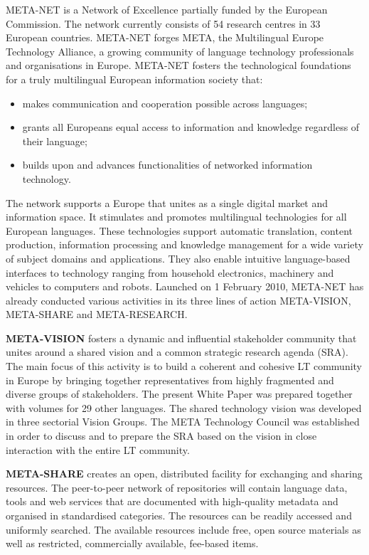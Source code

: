 \begin{multicols}{2}
META-NET is a Network of Excellence partially funded by the European Commission. The network currently consists of 54 research centres in 33 European countries\cite{rehm2011}. META-NET forges META, the Multilingual Europe Technology Alliance, a growing community of language technology professionals and organisations in Europe. META-NET fosters the technological foundations for a truly multilingual European information society that:

\begin{itemize}
\item makes communication and cooperation possible across languages;
\item grants all Europeans equal access to information and knowledge regardless of their language;
\item builds upon and advances functionalities of networked information technology.
\end{itemize}

The network supports a Europe that unites as a single digital market and information space. It stimulates and promotes multilingual technologies for all European languages. These technologies support automatic translation, content production, information processing and knowledge management for a wide variety of subject domains and applications. They also enable intuitive language-based interfaces to technology ranging from household electronics, machinery and vehicles to computers and robots.
Launched on 1 February 2010, META-NET has already conducted various activities in its three lines of action META-VISION, META-SHARE and META-RESEARCH.

\textbf{META-VISION} fosters a dynamic and influential stakeholder community that unites around a shared vision and a common strategic research agenda (SRA). The main focus of this activity is to build a coherent and cohesive LT community in Europe by bringing together representatives from highly fragmented and diverse groups of stakeholders. The present White Paper was prepared together with volumes for 29 other languages. The shared technology vision was developed in three sectorial Vision Groups. The META Technology Council was established in order to discuss and to prepare the SRA based on the vision in close interaction with the entire LT community.

\textbf{META-SHARE} creates an open, distributed facility for exchanging and sharing resources. The peer-to-peer network of repositories will contain language data, tools and web services that are documented with high-quality metadata and organised in standardised categories. The resources can be readily accessed and uniformly searched. The available resources include free, open source materials as well as restricted, commercially available, fee-based items.


\end{multicols}
